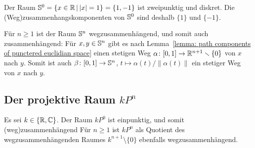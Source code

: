 Der Raum $\mathbb{S}^0 = \{x \in \mathbb{R} \,|\, |x| = 1\} = \{1, -1\}$ ist zweipunktig und diskret.
Die (Weg)zu\-sammen\-hangs\-kom\-po\-nen\-ten von $\mathbb{S}^0$ sind deshalb $\{1\}$ und $\{-1\}$.

Für $n \geq 1$ ist der Raum $\mathbb{S}^n$ wegzusammenhängend, und somit auch zusammenhängend:
Für $x, y \in \mathbb{S}^n$ gibt es nach Lemma~\ref{lemma: path components of punctered euclidian space} einen stetigen Weg $\alpha \colon [0,1] \to \mathbb{R}^{n+1} \smallsetminus \{0\}$ von $x$ nach $y$.
Somit ist auch $\beta \colon [0,1] \to \mathbb{S}^n$, $t \mapsto \alpha(t) / \|\alpha(t)\|$ ein stetiger Weg von $x$ nach $y$.





\subsection{Der projektive Raum \texorpdfstring{$kP^n$}{kPn}}

Es sei $k \in \{\mathbb{R}, \mathbb{C}\}$.
Der Raum $kP^0$ ist einpunktig, und somit (weg)zusammenhängend
Für $n \geq 1$ ist $kP^n$ als Quotient des wegzusammenhängenden Raumes $k^{n+1} \setminus \{0\}$ ebenfalls wegzusammenhängend.




